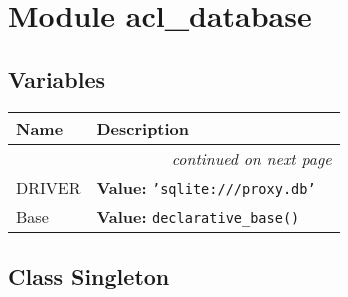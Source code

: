 %
%
%


\section{Module acl\_database}

    \label{acl_database}


  \subsection{Variables}

    \vspace{-1cm}
\hspace{\varindent}\begin{longtable}{|p{\varnamewidth}|p{\vardescrwidth}|l}
\cline{1-2}
\cline{1-2} \centering \textbf{Name} & \centering \textbf{Description}& \\
\cline{1-2}
\endhead\cline{1-2}\multicolumn{3}{r}{\small\textit{continued on next page}}\\\endfoot\cline{1-2}
\endlastfoot\raggedright D\-R\-I\-V\-E\-R\- & \raggedright \textbf{Value:} 
{\tt 'sqlite:///proxy.db'}&\\
\cline{1-2}
\raggedright B\-a\-s\-e\- & \raggedright \textbf{Value:} 
{\tt declarative\_base()}&\\
\cline{1-2}
\end{longtable}



\subsection{Class Singleton}

